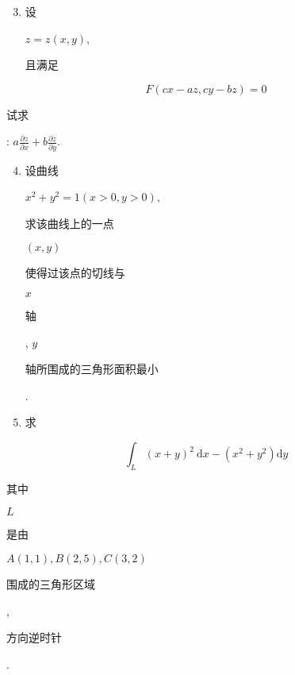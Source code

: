 \documentclass[10pt]{article}
\begin{document}
\begin{enumerate}
  \setcounter{enumi}{2}
  \item \begin{CJK}{UTF8}{mj}设\end{CJK} $z=z(x, y)$, \begin{CJK}{UTF8}{mj}且满足\end{CJK}
\end{enumerate}
$$
F(c x-a z, c y-b z)=0
$$
\begin{CJK}{UTF8}{mj}试求\end{CJK}: $a \frac{\partial z}{\partial x}+b \frac{\partial z}{\partial y}$.

\begin{enumerate}
  \setcounter{enumi}{3}
  \item \begin{CJK}{UTF8}{mj}设曲线\end{CJK} $x^{2}+y^{2}=1(x>0, y>0)$, \begin{CJK}{UTF8}{mj}求该曲线上的一点\end{CJK} $(x, y)$ \begin{CJK}{UTF8}{mj}使得过该点的切线与\end{CJK} $x$ \begin{CJK}{UTF8}{mj}轴\end{CJK}, $y$ \begin{CJK}{UTF8}{mj}轴所围成的三角形面积最小\end{CJK}.

  \item \begin{CJK}{UTF8}{mj}求\end{CJK}

\end{enumerate}
$$
\int_{L}(x+y)^{2} \mathrm{~d} x-\left(x^{2}+y^{2}\right) \mathrm{d} y
$$
\begin{CJK}{UTF8}{mj}其中\end{CJK} $L$ \begin{CJK}{UTF8}{mj}是由\end{CJK} $A(1,1), B(2,5), C(3,2)$ \begin{CJK}{UTF8}{mj}围成的三角形区域\end{CJK}, \begin{CJK}{UTF8}{mj}方向逆时针\end{CJK}.
\end{document}
